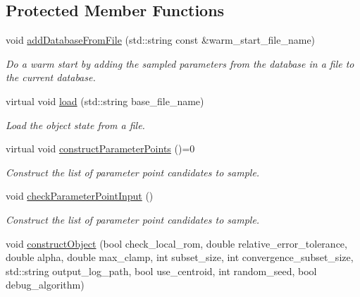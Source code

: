 \subsection*{Protected Member Functions}
\begin{DoxyCompactItemize}
\item 
void \hyperlink{class_c_a_r_o_m_1_1_greedy_parameter_point_sampler_aeb36614b0e92cd2592dfca70b9924dc5}{add\-Database\-From\-File} (std\-::string const \&warm\-\_\-start\-\_\-file\-\_\-name)
\begin{DoxyCompactList}\small\item\em Do a warm start by adding the sampled parameters from the database in a file to the current database. \end{DoxyCompactList}\item 
virtual void \hyperlink{class_c_a_r_o_m_1_1_greedy_parameter_point_sampler_a6f70e13fd528da79f93b250612af6e56}{load} (std\-::string base\-\_\-file\-\_\-name)
\begin{DoxyCompactList}\small\item\em Load the object state from a file. \end{DoxyCompactList}\item 
\hypertarget{class_c_a_r_o_m_1_1_greedy_parameter_point_sampler_a8709b4dbec32c3845fc41117a1f5dcfa}{virtual void \hyperlink{class_c_a_r_o_m_1_1_greedy_parameter_point_sampler_a8709b4dbec32c3845fc41117a1f5dcfa}{construct\-Parameter\-Points} ()=0}\label{class_c_a_r_o_m_1_1_greedy_parameter_point_sampler_a8709b4dbec32c3845fc41117a1f5dcfa}

\begin{DoxyCompactList}\small\item\em Construct the list of parameter point candidates to sample. \end{DoxyCompactList}\item 
\hypertarget{class_c_a_r_o_m_1_1_greedy_parameter_point_sampler_a577a3a0b7fd389c138b88e13f0637b37}{void \hyperlink{class_c_a_r_o_m_1_1_greedy_parameter_point_sampler_a577a3a0b7fd389c138b88e13f0637b37}{check\-Parameter\-Point\-Input} ()}\label{class_c_a_r_o_m_1_1_greedy_parameter_point_sampler_a577a3a0b7fd389c138b88e13f0637b37}

\begin{DoxyCompactList}\small\item\em Construct the list of parameter point candidates to sample. \end{DoxyCompactList}\item 
\hypertarget{class_c_a_r_o_m_1_1_greedy_parameter_point_sampler_aed2c1733d647a5369532096423369e51}{void \hyperlink{class_c_a_r_o_m_1_1_greedy_parameter_point_sampler_aed2c1733d647a5369532096423369e51}{construct\-Object} (bool check\-\_\-local\-\_\-rom, double relative\-\_\-error\-\_\-tolerance, double alpha, double max\-\_\-clamp, int subset\-\_\-size, int convergence\-\_\-subset\-\_\-size, std\-::string output\-\_\-log\-\_\-path, bool use\-\_\-centroid, int random\-\_\-seed, bool debug\-\_\-algorithm)}\label{class_c_a_r_o_m_1_1_greedy_parameter_point_sampler_aed2c1733d647a5369532096423369e51}


\end{DoxyCompactItemize}
